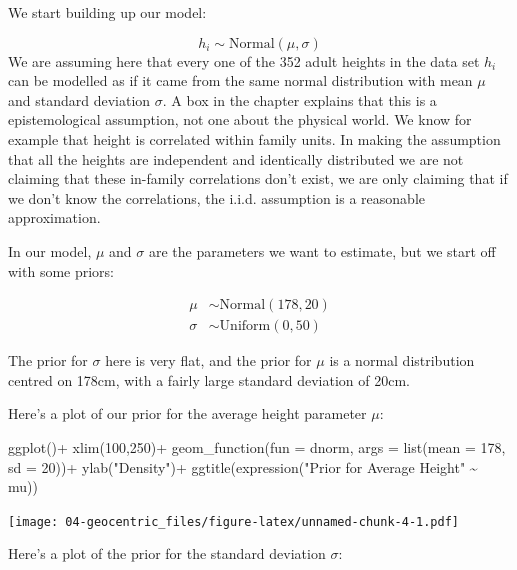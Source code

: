 \documentclass[
]{book}
\newenvironment{Shaded}{\begin{snugshade}}{\end{snugshade}}
\newcommand{\AttributeTok}[1]{\textcolor[rgb]{0.77,0.63,0.00}{#1}}
\newcommand{\DecValTok}[1]{\textcolor[rgb]{0.00,0.00,0.81}{#1}}
\newcommand{\FunctionTok}[1]{\textcolor[rgb]{0.00,0.00,0.00}{#1}}
\newcommand{\NormalTok}[1]{#1}
\newcommand{\SpecialCharTok}[1]{\textcolor[rgb]{0.00,0.00,0.00}{#1}}
\newcommand{\StringTok}[1]{\textcolor[rgb]{0.31,0.60,0.02}{#1}}
\begin{document}
We start building up our model:

\[
h_i \sim \text{Normal}(\mu, \sigma)
\]
We are assuming here that every one of the 352 adult heights in the data set \(h_i\) can be modelled as if it came from the same normal distribution with mean \(\mu\) and standard deviation \(\sigma\). A box in the chapter explains that this is a epistemological assumption, not one about the physical world. We know for example that height is correlated within family units. In making the assumption that all the heights are independent and identically distributed we are not claiming that these in-family correlations don't exist, we are only claiming that if we don't know the correlations, the i.i.d. assumption is a reasonable approximation.

In our model, \(\mu\) and \(\sigma\) are the parameters we want to estimate, but we start off with some priors:

\[
\begin{aligned}
\mu &\sim \text{Normal}(178, 20) \\
\sigma &\sim \text{Uniform}(0,50)
\end{aligned}
\]

The prior for \(\sigma\) here is very flat, and the prior for \(\mu\) is a normal distribution centred on 178cm, with a fairly large standard deviation of 20cm.

Here's a plot of our prior for the average height parameter \(\mu\):

\begin{Shaded}
\begin{Highlighting}[]
\FunctionTok{ggplot}\NormalTok{()}\SpecialCharTok{+}
  \FunctionTok{xlim}\NormalTok{(}\DecValTok{100}\NormalTok{,}\DecValTok{250}\NormalTok{)}\SpecialCharTok{+}
  \FunctionTok{geom\_function}\NormalTok{(}\AttributeTok{fun =}\NormalTok{ dnorm, }\AttributeTok{args =} \FunctionTok{list}\NormalTok{(}\AttributeTok{mean =} \DecValTok{178}\NormalTok{, }\AttributeTok{sd =} \DecValTok{20}\NormalTok{))}\SpecialCharTok{+}
  \FunctionTok{ylab}\NormalTok{(}\StringTok{"Density"}\NormalTok{)}\SpecialCharTok{+}
  \FunctionTok{ggtitle}\NormalTok{(}\FunctionTok{expression}\NormalTok{(}\StringTok{"Prior for Average Height"} \SpecialCharTok{\textasciitilde{}}\NormalTok{ mu))}
\end{Highlighting}
\end{Shaded}

\texttt{[image: 04-geocentric\_files/figure-latex/unnamed-chunk-4-1.pdf]}

Here's a plot of the prior for the standard deviation \(\sigma\):
\end{document}
